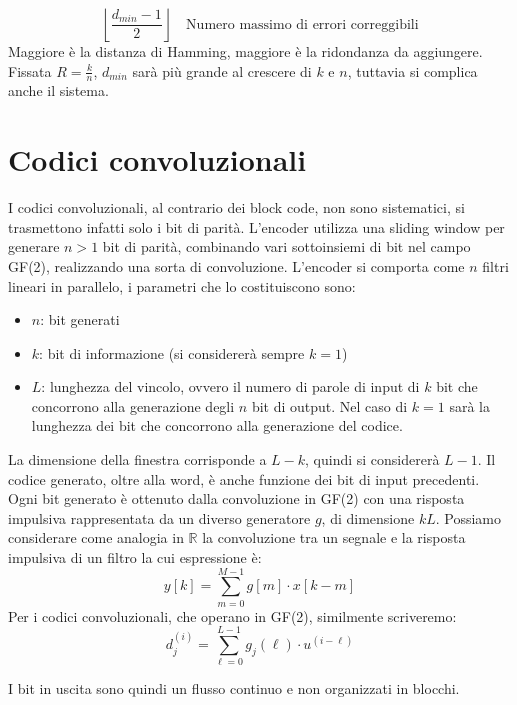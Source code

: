 \[
    \left\lfloor \frac{d_{min} - 1}{2} \right\rfloor \quad \text{Numero massimo di errori correggibili}
\]
Maggiore è la distanza di Hamming, maggiore è la ridondanza da aggiungere.
Fissata $R=\frac{k}{n}$, $d_{min}$ sarà più grande al crescere di $k$ e $n$, tuttavia si complica anche il sistema.
\section*{Codici convoluzionali}

I codici convoluzionali, al contrario dei block code, non sono sistematici, si trasmettono infatti solo i bit di parità.
L'encoder utilizza una sliding window per generare $n>1$ bit di parità, combinando vari sottoinsiemi di bit nel campo GF(2), realizzando una sorta di convoluzione.
L'encoder si comporta come $n$ filtri lineari in parallelo, i parametri che lo costituiscono sono:
\begin{itemize}
    \item $n$: bit generati
    \item $k$: bit di informazione (si considererà sempre $k=1$)
    \item $L$: lunghezza del vincolo, ovvero il numero di parole di input di $k$ bit che concorrono alla generazione degli $n$ bit di output. Nel caso di $k=1$ sarà la lunghezza dei bit che concorrono alla generazione del codice.
\end{itemize}

La dimensione della finestra corrisponde a $L-k$, quindi si considererà $L-1$. Il codice generato, oltre alla word, è anche funzione dei bit di input precedenti. Ogni bit generato è ottenuto dalla convoluzione in GF(2) con una risposta impulsiva rappresentata da un diverso generatore $g$, di dimensione $kL$.
Possiamo considerare come analogia in $\mathbb{R}$ la convoluzione tra un segnale e la risposta impulsiva di un filtro la cui espressione è:
\[
    y\left[k\right] = \sum_{m=0}^{M-1} g\left[m\right] \cdot x\left[k-m\right]
\]
Per i codici convoluzionali, che operano in GF(2), similmente scriveremo:
\[
    d_j^{\left(i\right)} = \sum_{\ell=0}^{L-1} g_j\left(\ell\right) \cdot u^{\left( i - \ell \right)}
\]

I bit in uscita sono quindi un flusso continuo e non organizzati in blocchi.

